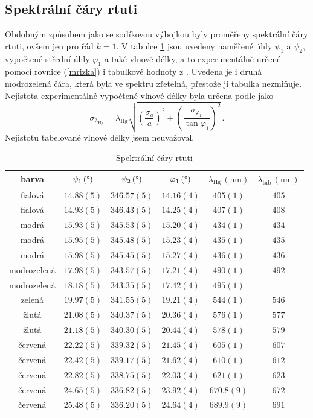 \documentclass{../concepts/titul_protokol_p/prepareprotokol} %
\newcommand{\relative}[1]{
\frac{\sigma_{#1}}{#1}
}
\newcommand{\squared}[1]{
\left( #1 \right)^2
}
\newcommand{\relsqr}[1]{
\squared{\relative{#1}}
}
\begin{document}
\subsection{Spektrální čáry rtuti}

Obdobným způsobem jako se sodíkovou výbojkou byly proměřeny spektrální čáry rtuti, ovšem jen pro řád $k=1$.
V tabulce \ref{tab:rtut} jsou uvedeny naměřené úhly $\psi_1$ a $\psi_2$,
vypočtené střední úhly $\varphi_1$ a také vlnové délky, a to experimentálně určené
pomocí rovnice (\ref{mrizka}) i tabulkové hodnoty z \cite{tabulka}. Uvedena
je i druhá modrozelená čára, která byla ve spektru zřetelná, přestože ji
tabulka \cite{tabulka} nezmiňuje. Nejistota experimentálně vypočtené vlnové
délky byla určena podle \cite{englich} jako
\begin{equation}\label{sigmalambda}
    \sigma_{\lambda_\mathrm{Hg}} = \lambda_\mathrm{Hg} \sqrt{\relsqr{a} + \squared{\frac{\sigma_{\varphi_1}}{\tan \varphi_1}}} \, .
\end{equation}
Nejistotu tabelované vlnové délky jsem neuvažoval.

\begin{table}[!htbp]
\centering
\caption{Spektrální čáry rtuti}
\begin{tabular}{cccccc}
 \toprule
 barva & $\psi_1\, (\mathrm{\degree})$ & $\psi_2\, (\mathrm{\degree})$ & $\varphi_1\, (\mathrm{\degree})$ & $\lambda_\mathrm{Hg}\, (\mathrm{nm})$ & $\lambda_\mathrm{tab}\, (\mathrm{nm})$ \\
 \midrule
 fialová & $14.88(5)$ & $346.57(5)$ & $14.16(4)$ & $405(1)$ & $405$ \\
 fialová & $14.93(5)$ & $346.43(5)$ & $14.25(4)$ & $407(1)$ & $408$ \\
 modrá & $15.93(5)$ & $345.53(5)$ & $15.20(4)$ & $434(1)$ & $434$ \\
 modrá & $15.95(5)$ & $345.48(5)$ & $15.23(4)$ & $435(1)$ & $435$ \\
 modrá & $15.98(5)$ & $345.45(5)$ & $15.27(4)$ & $436(1)$ & $436$ \\
 modrozelená & $17.98(5)$ & $343.57(5)$ & $17.21(4)$ & $490(1)$ & $492$ \\
 modrozelená & $18.18(5)$ & $343.35(5)$ & $17.42(4)$ & $495(1)$ &  \\
 zelená & $19.97(5)$ & $341.55(5)$ & $19.21(4)$ & $544(1)$ & $546$ \\
 žlutá & $21.08(5)$ & $340.37(5)$ & $20.36(4)$ & $576(1)$ & $577$ \\
 žlutá & $21.18(5)$ & $340.30(5)$ & $20.44(4)$ & $578(1)$ & $579$ \\
 červená & $22.22(5)$ & $339.32(5)$ & $21.45(4)$ & $605(1)$ & $607$ \\
 červená & $22.42(5)$ & $339.17(5)$ & $21.62(4)$ & $610(1)$ & $612$ \\
 červená & $22.82(5)$ & $338.75(5)$ & $22.03(4)$ & $621(1)$ & $623$ \\
 červená & $24.65(5)$ & $336.82(5)$ & $23.92(4)$ & $670.8(9)$ & $672$ \\
 červená & $25.48(5)$ & $336.20(5)$ & $24.64(4)$ & $689.9(9)$ & $691$ \\
 \bottomrule
\end{tabular}
\label{tab:rtut}
\end{table}
\end{document}
